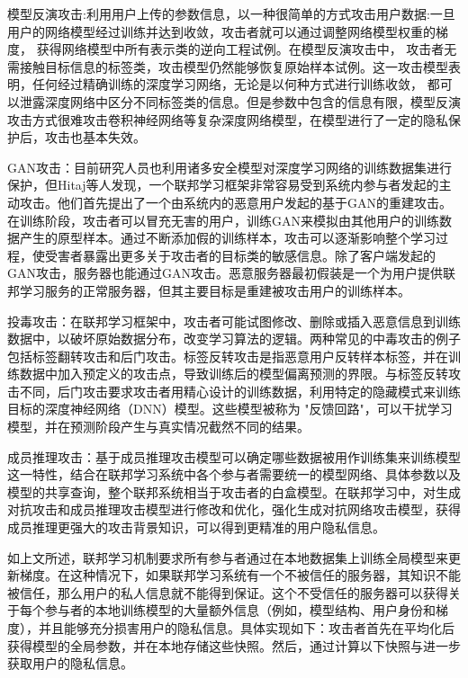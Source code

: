 模型反演攻击:利用用户上传的参数信息，以一种很简单的方式攻击用户数据:一旦用户的网络模型经过训练并达到收敛，攻击者就可以通过调整网络模型权重的梯度， 获得网络模型中所有表示类的逆向工程试例。在模型反演攻击中， 攻击者无需接触目标信息的标签类，攻击模型仍然能够恢复原始样本试例。这一攻击模型表明，任何经过精确训练的深度学习网络，无论是以何种方式进行训练收敛， 都可以泄露深度网络中区分不同标签类的信息。但是参数中包含的信息有限，模型反演攻击方式很难攻击卷积神经网络等复杂深度网络模型，在模型进行了一定的隐私保护后，攻击也基本失效。

GAN攻击：目前研究人员也利用诸多安全模型对深度学习网络的训练数据集进行保护，但Hitaj等人发现，一个联邦学习框架非常容易受到系统内参与者发起的主动攻击。他们首先提出了一个由系统内的恶意用户发起的基于GAN的重建攻击。在训练阶段，攻击者可以冒充无害的用户，训练GAN来模拟由其他用户的训练数据产生的原型样本。通过不断添加假的训练样本，攻击可以逐渐影响整个学习过程，使受害者暴露出更多关于攻击者的目标类的敏感信息。除了客户端发起的GAN攻击，服务器也能通过GAN攻击。恶意服务器最初假装是一个为用户提供联邦学习服务的正常服务器，但其主要目标是重建被攻击用户的训练样本。

投毒攻击：在联邦学习框架中，攻击者可能试图修改、删除或插入恶意信息到训练数据中，以破坏原始数据分布，改变学习算法的逻辑。两种常见的中毒攻击的例子包括标签翻转攻击和后门攻击。标签反转攻击是指恶意用户反转样本标签，并在训练数据中加入预定义的攻击点，导致训练后的模型偏离预测的界限。与标签反转攻击不同，后门攻击要求攻击者用精心设计的训练数据，利用特定的隐藏模式来训练目标的深度神经网络（DNN）模型。这些模型被称为 "反馈回路"，可以干扰学习模型，并在预测阶段产生与真实情况截然不同的结果。

成员推理攻击：基于成员推理攻击模型可以确定哪些数据被用作训练集来训练模型这一特性，结合在联邦学习系统中各个参与者需要统一的模型网络、具体参数以及模型的共享查询，整个联邦系统相当于攻击者的白盒模型。在联邦学习中，对生成对抗攻击和成员推理攻击模型进行修改和优化，强化生成对抗网络攻击模型，获得成员推理更强大的攻击背景知识，可以得到更精准的用户隐私信息。

如上文所述，联邦学习机制要求所有参与者通过在本地数据集上训练全局模型来更新梯度。在这种情况下，如果联邦学习系统有一个不被信任的服务器，其知识不能被信任，那么用户的私人信息就不能得到保证。这个不受信任的服务器可以获得关于每个参与者的本地训练模型的大量额外信息（例如，模型结构、用户身份和梯度），并且能够充分损害用户的隐私信息。具体实现如下：攻击者首先在平均化后获得模型的全局参数，并在本地存储这些快照。然后，通过计算以下快照与进一步获取用户的隐私信息。

